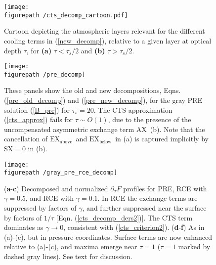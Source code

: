 \documentclass{ametsoc}
\newcommand{\eqnref}[1]{(\ref{#1})}
\newcommand{\pptau}{\ensuremath{\partial_\tau}}
\newcommand{\taus}{\ensuremath{\tau_s}}
\newcommand{\SX}{\ensuremath{\mathrm{SX}}}
\newcommand{\AX}{\ensuremath{\mathrm{AX}}}
\newcommand{\EXbelow}{\ensuremath{\mathrm{EX_{below}}}}
\newcommand{\EXabove}{\ensuremath{\mathrm{EX_{above}}}}
\newcommand{\figurepath}{./}
\begin{document}
%
%
%
 
 



\begin{figure}[h!]
	\begin{center}
			\texttt{[image: \\figurepath /cts\_decomp\_cartoon.pdf]}
		\caption{Cartoon depicting the atmospheric layers relevant for the different cooling terms in \eqnref{new_decomp}, relative to a given layer at optical depth $\tau$, for \textbf{(a)} $\tau < \taus/2$  and \textbf{(b)} $\tau>\taus/2$.
		\label{decomp_cartoon}
		}
	\end{center}
\end{figure}

\begin{figure}[h]
	\begin{center}
			\texttt{[image: \\figurepath /pre\_decomp]}
		\caption{These panels show the old and new decompositions, Eqns. \eqnref{pre_old_decomp}  and  \eqnref{pre_new_decomp}, for the gray PRE solution \eqnref{B_pre} for $\taus=20$. The CTS approximation \eqnref{cts_approx} fails for $\tau\sim O(1)$, due to the presence of the uncompensated asymmetric exchange term \AX\ (b). Note that the cancellation of \EXabove\ and \EXbelow\ in (a) is captured implicitly by $\SX=0$ in (b).
		\label{pre_decomp}
		}
	\end{center}
\end{figure}

\begin{figure}[h]
	\begin{center}
			\texttt{[image: \\figurepath /gray\_pre\_rce\_decomp]}
		\caption{(\textbf{a}-\textbf{c}) Decomposed and normalized $\pptau F$ profiles for PRE, RCE with $\gamma=0.5$, and RCE with $\gamma=0.1$. In RCE the exchange terms are suppressed by factors of $\gamma$, and further suppressed near the surface by factors of $1/\tau$ [Eqn. \eqnref{cts_decomp_ders2}]. The CTS term dominates as $\gamma\rightarrow 0$, consistent with \eqnref{cts_criterion2}. 
		(\textbf{d}-\textbf{f}) As in (a)-(c), but in pressure coordinates. Surface terms are now enhanced relative to (a)-(c), and maxima emerge near  $\tau= 1$ ($\tau=1$ marked by dashed gray lines). See text for discussion.
		\label{gray_rce}
		}
	\end{center}
\end{figure}
\end{document}
